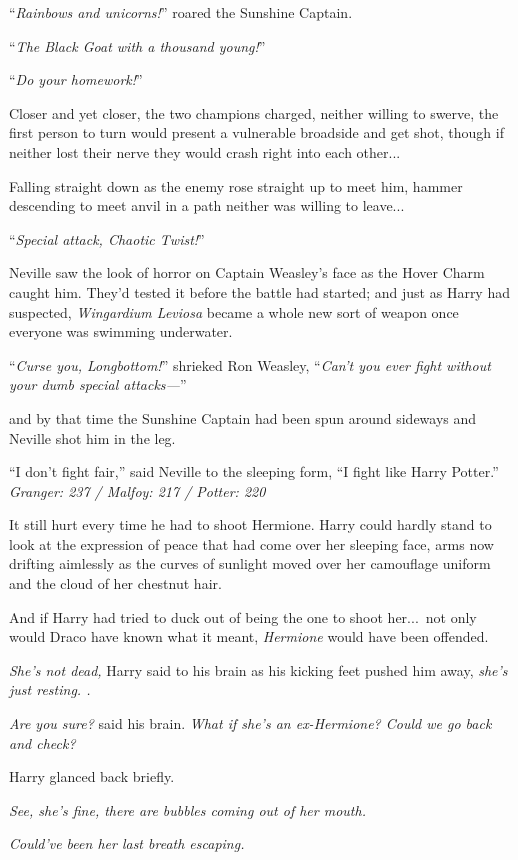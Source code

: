 “\emph{Rainbows and unicorns!}” roared the Sunshine Captain.

“\emph{The Black Goat with a thousand young!}”

“\emph{Do your homework!}”

Closer and yet closer, the two champions charged, neither willing to swerve, the first person to turn would present a vulnerable broadside and get shot, though if neither lost their nerve they would crash right into each other...

Falling straight down as the enemy rose straight up to meet him, hammer descending to meet anvil in a path neither was willing to leave...

“\emph{Special attack, Chaotic Twist!}”

Neville saw the look of horror on Captain Weasley’s face as the Hover Charm caught him. They’d tested it before the battle had started; and just as Harry had suspected, \emph{Wingardium Leviosa} became a whole new sort of weapon once everyone was swimming underwater.

“\emph{Curse you, Longbottom!}” shrieked Ron Weasley, “\emph{Can’t you ever fight without your dumb special attacks—}”

and by that time the Sunshine Captain had been spun around sideways and Neville shot him in the leg.

“I don’t fight fair,” said Neville to the sleeping form, “I fight like Harry Potter.”
\sbreak
\emph{Granger: 237 / Malfoy: 217 / Potter: 220}

It still hurt every time he had to shoot Hermione. Harry could hardly stand to look at the expression of peace that had come over her sleeping face, arms now drifting aimlessly as the curves of sunlight moved over her camouflage uniform and the cloud of her chestnut hair.

And if Harry had tried to duck out of being the one to shoot her...\ not only would Draco have known what it meant, \emph{Hermione} would have been offended.

\emph{She’s not dead,} Harry said to his brain as his kicking feet pushed him away, \emph{she’s just resting. .}

\emph{Are you sure?} said his brain. \emph{What if she’s an ex-Hermione? Could we go back and check?}

Harry glanced back briefly.

\emph{See, she’s fine, there are bubbles coming out of her mouth.}

\emph{Could’ve been her last breath escaping.}

